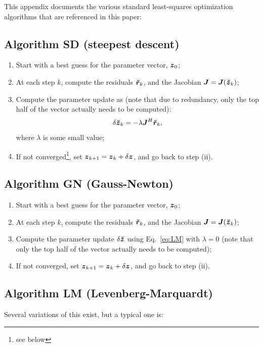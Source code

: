 \documentclass[useAMS,usenatbib]{mn2e}
\newcommand{\zz}{\bmath{z}}
\newcommand{\mat}[1]{{\bmath{#1}}}
\newcommand{\JJ}{\mat{J}} %
\begin{document}
This appendix documents the various standard least-squares optimization algorithms 
that are referenced in this paper:

\subsection{Algorithm SD (steepest descent)}

\begin{enumerate}
\item Start with a best guess for the parameter vector, $\bmath{z}_0$;
\item At each step $k$, compute the residuals $\Rr_k$, and the Jacobian
$\JJ=\JJ(\Zz_k)$;
\item Compute the parameter update as (note that due to redundancy, only the top half of the vector actually needs
to be computed):
\[
\delta\Zz_k = - \lambda \JJ^H \Rr_k,
\]
where $\lambda$ is some small value;
\item If not converged\footnote{see below}, set $\bmath{z}_{k+1}=\bmath{z}_k+\delta\zz$, and go back to step (ii).
\end{enumerate}

\subsection{Algorithm GN (Gauss-Newton)}

\begin{enumerate}
\item Start with a best guess for the parameter vector, $\bmath{z}_0$;
\item At each step $k$, compute the residuals $\Rr_k$, and the Jacobian
$\JJ=\JJ(\Zz_k)$;
\item Compute the parameter update $\delta\Zz$ using Eq.~\ref{eq:LM} with $\lambda=0$ (note that only the top half of the vector actually needs to be computed);
\item If not converged, set $\bmath{z}_{k+1}=\bmath{z}_k+\delta\zz$, and go back to step (ii).
\end{enumerate}

\subsection{Algorithm LM (Levenberg-Marquardt)}

Several variations of this exist, but a typical one is:
\end{document}
